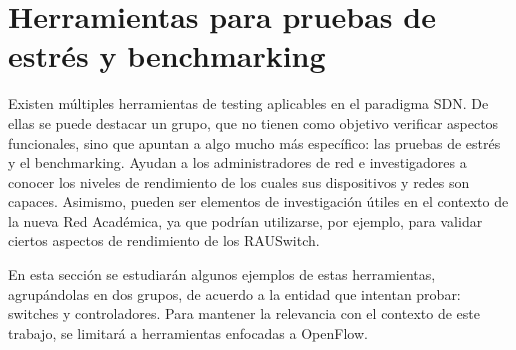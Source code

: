\section{Herramientas para pruebas de estrés y benchmarking}
Existen múltiples herramientas de testing aplicables en el paradigma SDN. De ellas se puede destacar un grupo, que no tienen como objetivo verificar aspectos funcionales, sino que apuntan a algo mucho más específico: las pruebas de estrés y el benchmarking. Ayudan a los administradores de red e investigadores a conocer los niveles de rendimiento de los cuales sus dispositivos y redes son capaces. Asimismo, pueden ser elementos de investigación útiles en el contexto de la nueva Red Académica, ya que podrían utilizarse, por ejemplo, para validar ciertos aspectos de rendimiento de los RAUSwitch.

En esta sección se estudiarán algunos ejemplos de estas herramientas, agrupándolas en dos grupos, de acuerdo a la entidad que intentan probar: switches y controladores. Para mantener la relevancia con el contexto de este trabajo, se limitará a herramientas enfocadas a OpenFlow.

